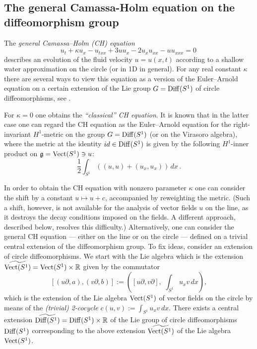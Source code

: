 \documentclass[11pt]{article}
\theoremstyle{definition}
\newcounter{ai}
\begin{document}


\subsection{The general Camassa-Holm equation on the diffeomorphism group}
\label{sec:camassa}

The {\it general Camassa--Holm (CH) equation}
$$
u_t + \kappa u_x - u_{txx} + 3uu_x - 2u_xu_{xx} - uu_{xxx} = 0\,
$$
describes an evolution of the fluid velocity $u=u(x,t)$ according to a shallow water approximation 
on the circle (or in 1D in general). For any real constant $\kappa$ there are several ways to view this equation 
as a version of the Euler--Arnold equation on a certain extension of the Lie group 
${G}={\rm Diff}(S^1)$ of circle diffeomorphisms, see \cite{misiolek1998}.

For $\kappa=0$ one obtains the {\it ``classical'' CH equation}.
It is known that in the latter case one can regard the CH equation as the Euler--Arnold equation
for the right-invariant $H^1$-metric on the group ${G}={\rm Diff}(S^1)$ (or on the Virasoro algebra), 
where the metric at the identity
$id\in {\rm Diff}(S^1)$ is given by the following $H^1$-inner product on $\mathfrak{g}={\rm Vect}(S^1)\ni u$:
$$
\frac 12\int_{S^1} ((u, u)+(u_x, u_x)) \,dx\,.
$$

In order to obtain the CH equation with nonzero parameter $\kappa$ one can consider the shift by a constant 
$u\mapsto u+c$, accompanied by reweighting the metric. (Such a shift, however, is not available for the analysis of vector fields $u$ on the line, as it destroys the decay conditions imposed on the fields. A different approach, described below, resolves this difficulty.) Alternatively, one can consider the general CH equation --- either on the line or on the circle --- defined on a trivial central extension of the diffeomorphism group. To fix ideas, consider an extension of circle diffeomorphisms. We start with the Lie algebra which 
 is the  extension $\widetilde{{\rm Vect}(S^1)} ={\rm Vect}(S^1)\times \mathbb{R}$ given by the commutator 
$$
[(u\partial, a), (v\partial, b)]:=([u\partial,v\partial],  \,\, \int_{S^1} u_xv\, dx),
$$ 
which is the extension of the Lie algebra ${\rm Vect}(S^1)$ of vector fields on the circle by means of the {\it (trivial) 2-cocycle} $c(u,v):=\int_{S^1} u_xv\, dx$. 
There exists a central extension 
$\widetilde{ {\rm Diff}(S^1)}={\rm Diff}(S^1)\times \mathbb{R}$ of the Lie group of circle diffeomorphisms ${\rm Diff}(S^1)$ corresponding to the above extension $\widetilde{{\rm Vect}(S^1)}$ of the Lie algebra ${\rm Vect}(S^1)$.
\end{document}
